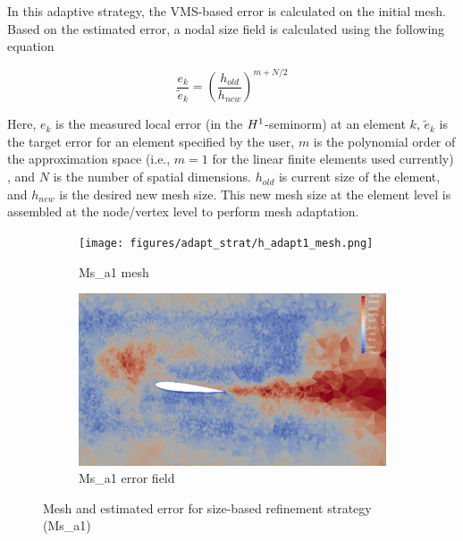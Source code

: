 In this adaptive strategy, the VMS-based error is calculated on the initial mesh. Based on the estimated error, a nodal size field is calculated using the following equation \cite{zhang19}

\begin{equation}
\frac{e_k}{\tilde{e}_k} = \left(\frac{h_{old}}{h_{new}}\right)^{m+N/2} 
\label{eq:diez}
\end{equation}

Here, $e_k$ is the measured local error (in the $H^{1}$-seminorm) at an element $k$, $\tilde{e}_k$ is the target error for an element specified by the user, $m$ is the polynomial order of the approximation space (i.e., $m=1$ for the linear finite elements used currently) , and $N$ is the number of spatial dimensions. $h_{old}$ is current size of the element, and $h_{new}$ is the desired new mesh size.
This new mesh size at the element level is assembled at the node/vertex level to perform mesh adaptation.

\begin{figure}[H]
\centering

\begin{subfigure}[b]{0.475\textwidth}
\centering
\texttt{[image: figures/adapt\_strat/h\_adapt1\_mesh.png]}
\caption{Ms\_a1 mesh}
\label{fig:h_adapt1_mesh}
\end{subfigure}
\begin{subfigure}[b]{0.475\textwidth}
\centering
\includegraphics[width=1\textwidth]{figures/adapt_strat/h_adapt1_error_plot.png}
\caption{Ms\_a1 error field}
\label{fig:h_adapt1_error_plot}
\end{subfigure}

\caption{Mesh and estimated error for size-based refinement strategy (Ms\_a1)}
\end{figure}

